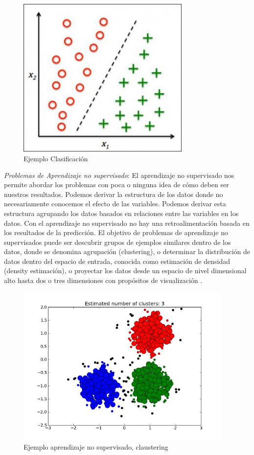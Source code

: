 \begin{figure}[H] \centering
  \includegraphics[height=8cm,keepaspectratio=true,clip=true]{imagenes/MarcoTeorico/classification.jpg}
  \caption{Ejemplo Clasificación}\label{Fig:clasificacion}
\end{figure}


\textit{Problemas de Aprendizaje no supervisado}: El aprendizaje no supervisado nos permite abordar los problemas con
poca o ninguna idea de cómo deben ser nuestros resultados. Podemos derivar la estructura de los datos donde no necesariamente conocemos el efecto de las variables. Podemos derivar esta estructura agrupando los datos basados en relaciones entre las variables en los datos. Con el aprendizaje no supervisado no hay una retroalimentación basada en los resultados de la predicción. El objetivo de problemas de aprendizaje no supervisados puede ser descubrir grupos de ejemplos similares dentro de los datos, donde se denomina agrupación (clustering), o determinar la distribución de datos dentro del espacio de entrada, conocida como estimación de densidad (density estimación), o proyectar los datos desde un espacio de nivel dimensional alto hasta dos o tres dimensiones con propósitos de visualización \citep{bishop}.

\begin{figure}[H] \centering
  \includegraphics[height=8cm,keepaspectratio=true,clip=true]{imagenes/MarcoTeorico/claustering.png}
  \caption{Ejemplo aprendizaje no supervisado, claustering}\label{Fig:clauster}
\end{figure}



